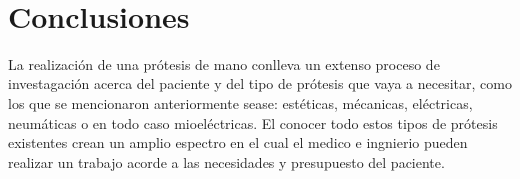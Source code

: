 \documentclass{article}
\begin{document}
\begin{description}
\begin{description}
\end{description}

\\
\section{Conclusiones}
La realización de una prótesis de mano conlleva un extenso proceso de investagación acerca del paciente y del tipo de prótesis que vaya a necesitar, como los que se mencionaron anteriormente sease: estéticas, mécanicas, eléctricas, neumáticas o en todo caso mioeléctricas. El conocer todo estos tipos de prótesis existentes crean un amplio espectro en el cual el medico e ingnierio pueden realizar un trabajo acorde a las necesidades y presupuesto del paciente. 

\\


\end{document}

